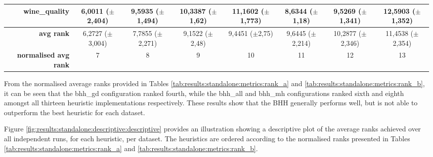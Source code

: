 \documentclass[preprint,review,12pt]{elsarticle}
\begin{document}
\begin{table}[htb]
{\begin{tabular}{r|c|c|ccccc|}
			\textbf{wine\_quality}        & \cellcolor[rgb]{ 1,  .922,  .518}6,0011 ($\pm$2,404)                              & \cellcolor[rgb]{ .988,  .647,  .467}9,5935 ($\pm$1,494) & \cellcolor[rgb]{ .984,  .588,  .455}10,3387 ($\pm$1,62)  & \cellcolor[rgb]{ .98,  .525,  .443}11,1602 ($\pm$1,773)  & \cellcolor[rgb]{ .992,  .722,  .482}8,6344 ($\pm$1,18)   & \cellcolor[rgb]{ .988,  .651,  .467}9,5269 ($\pm$1,341)  & \cellcolor[rgb]{ .973,  .412,  .42}12,5903 ($\pm$1,352)  \\
			\midrule
			\textbf{avg rank}             & \cellcolor[rgb]{ 1,  .922,  .518}6,2727 ($\pm$3,004)                              & \cellcolor[rgb]{ .992,  .776,  .49}7,7855 ($\pm$2,271)  & \cellcolor[rgb]{ .988,  .639,  .467}9,1522 ($\pm$2,48)   & \cellcolor[rgb]{ .984,  .612,  .459}9,4451 ($\pm$2,75)   & \cellcolor[rgb]{ .984,  .592,  .455}9,6445 ($\pm$2,214)  & \cellcolor[rgb]{ .98,  .529,  .443}10,2877 ($\pm$2,346)  & \cellcolor[rgb]{ .973,  .412,  .42}11,4538 ($\pm$2,354)  \\
			\midrule
			\textbf{normalised avg rank}  & \cellcolor[rgb]{ 1,  .922,  .518}7                                                & \cellcolor[rgb]{ .996,  .839,  .502}8                   & \cellcolor[rgb]{ .992,  .753,  .486}9                    & \cellcolor[rgb]{ .988,  .667,  .471}10                   & \cellcolor[rgb]{ .984,  .584,  .455}11                   & \cellcolor[rgb]{ .98,  .498,  .439}12                    & \cellcolor[rgb]{ .973,  .412,  .42}13                    \\
			\cmidrule{3-3}\end{tabular}%
	}
\end{table}%

From the normalised average ranks provided in Tables \ref{tab:results:standalone:metrics:rank_a} and \ref{tab:results:standalone:metrics:rank_b}, it can be seen that the bhh\_gd configuration ranked fourth, while the bhh\_all and bhh\_mh configurations ranked sixth and eighth amongst all thirteen heuristic implementations respectively. These results show that the \acs{BHH} generally performs well, but is not able to outperform the best heuristic for each dataset.

Figure \ref{fig:results:standalone:descriptive:descriptive} provides an illustration showing a descriptive plot of the average ranks achieved over all independent runs, for each heuristic, per dataset. The heuristics are ordered according to the normalised ranks presented in Tables \ref{tab:results:standalone:metrics:rank_a} and \ref{tab:results:standalone:metrics:rank_b}.
\end{document}
